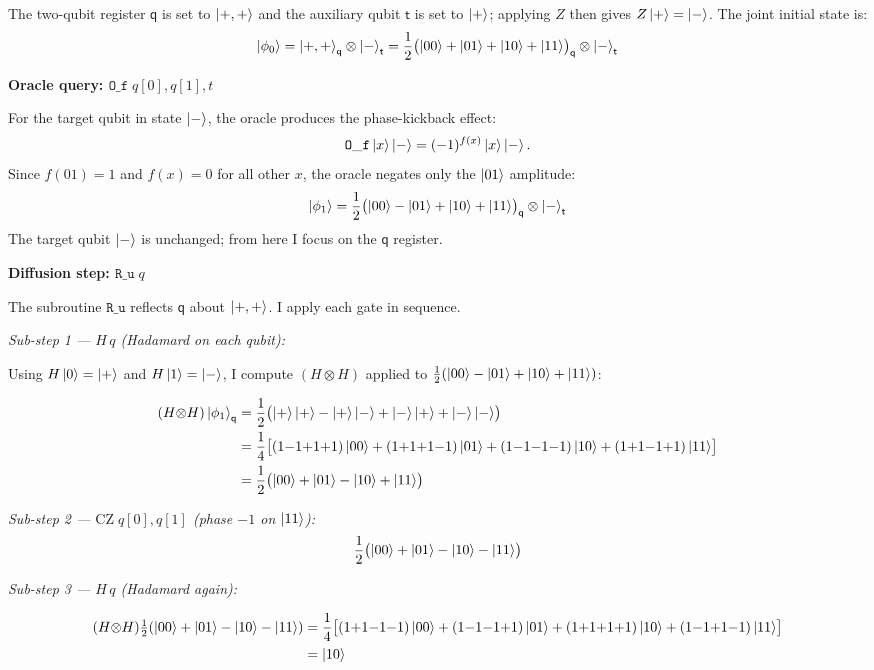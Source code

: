 \documentclass[12pt,a4paper]{article}
\begin{document}
\medskip
The two-qubit register $\mathsf{q}$ is set to $\ket{+,+}$ and the auxiliary qubit $\mathsf{t}$
is set to $\ket{+}$; applying $Z$ then gives $Z\ket{+}=\ket{-}$.
The joint initial state is:
\[
  \ket{\phi_0} = \ket{+,+}_{\mathsf{q}}\otimes\ket{-}_{\mathsf{t}}
  = \frac{1}{2}\bigl(\ket{00}+\ket{01}+\ket{10}+\ket{11}\bigr)_{\mathsf{q}}\otimes\ket{-}_{\mathsf{t}}
\]

\medskip
\textbf{Oracle query: $\mathtt{O\_f}\;q[0],q[1],t$}

\medskip
For the target qubit in state $\ket{-}$, the oracle produces the phase-kickback effect:
\[
  \mathtt{O\_f}\ket{x}\ket{-} = (-1)^{f(x)}\ket{x}\ket{-}.
\]
Since $f(01)=1$ and $f(x)=0$ for all other $x$, the oracle negates only the $\ket{01}$ amplitude:
\[
  \ket{\phi_1}
  = \frac{1}{2}\bigl(\ket{00}-\ket{01}+\ket{10}+\ket{11}\bigr)_{\mathsf{q}}\otimes\ket{-}_{\mathsf{t}}
\]
The target qubit $\ket{-}$ is unchanged; from here I focus on the $\mathsf{q}$ register.

\medskip
\textbf{Diffusion step: $\mathtt{R\_u}\;q$}

\medskip
The subroutine $\mathtt{R\_u}$ reflects $\mathsf{q}$ about $\ket{+,+}$.
I apply each gate in sequence.

\textit{Sub-step 1 --- $H\,q$ (Hadamard on each qubit):}

Using $H\ket{0}=\ket{+}$ and $H\ket{1}=\ket{-}$, I compute $(H\otimes H)$ applied to
$\tfrac{1}{2}(\ket{00}-\ket{01}+\ket{10}+\ket{11})$:

\begin{align*}
(H{\otimes}H)\ket{\phi_1}_{\mathsf{q}}
  &= \frac{1}{2}\bigl(\ket{+}\ket{+}-\ket{+}\ket{-}+\ket{-}\ket{+}+\ket{-}\ket{-}\bigr) \\
  &= \frac{1}{4}\bigl[(1{-}1{+}1{+}1)\ket{00}+(1{+}1{+}1{-}1)\ket{01}
     +(1{-}1{-}1{-}1)\ket{10}+(1{+}1{-}1{+}1)\ket{11}\bigr] \\
  &= \frac{1}{2}\bigl(\ket{00}+\ket{01}-\ket{10}+\ket{11}\bigr)
\end{align*}

\textit{Sub-step 2 --- $\mathrm{CZ}\;q[0],q[1]$ (phase $-1$ on $\ket{11}$):}
\[
  \frac{1}{2}\bigl(\ket{00}+\ket{01}-\ket{10}-\ket{11}\bigr)
\]

\textit{Sub-step 3 --- $H\,q$ (Hadamard again):}

\begin{align*}
(H{\otimes}H)\tfrac{1}{2}(\ket{00}+\ket{01}-\ket{10}-\ket{11})
  &= \frac{1}{4}\bigl[(1{+}1{-}1{-}1)\ket{00}+(1{-}1{-}1{+}1)\ket{01}
     +(1{+}1{+}1{+}1)\ket{10}+(1{-}1{+}1{-}1)\ket{11}\bigr] \\
  &= \ket{10}
\end{align*}
\end{document}
